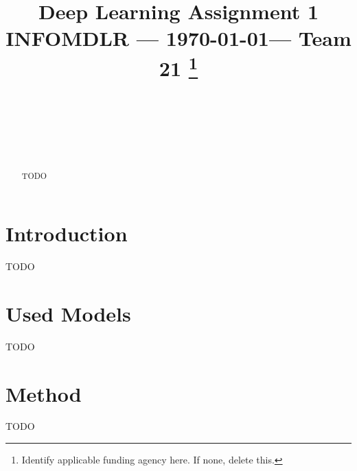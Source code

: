 \documentclass[conference]{IEEEtran}
\begin{document}
\title{Deep Learning Assignment 1\\ 
{\small INFOMDLR --- \today --- Team 21}
\thanks{Identify applicable funding agency here. If none, delete this.}
}

\author{
 \\
\and
{}
 \\
\and
{}
 \\
}

\maketitle

\begin{abstract}
    TODO
\end{abstract}

\section{Introduction}
    TODO
\section{Used Models}
    TODO
\section{Method}
    TODO
\end{document}
